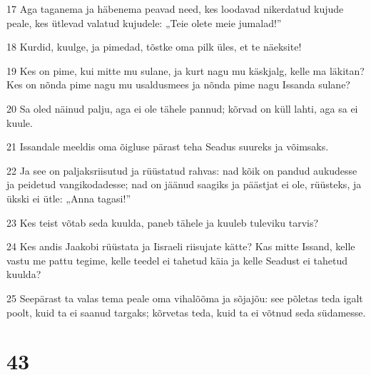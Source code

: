 \par 17 Aga taganema ja häbenema peavad need, kes loodavad nikerdatud kujude peale, kes ütlevad valatud kujudele: „Teie olete meie jumalad!”
\par 18 Kurdid, kuulge, ja pimedad, tõstke oma pilk üles, et te näeksite!
\par 19 Kes on pime, kui mitte mu sulane, ja kurt nagu mu käskjalg, kelle ma läkitan? Kes on nõnda pime nagu mu usaldusmees ja nõnda pime nagu Issanda sulane?
\par 20 Sa oled näinud palju, aga ei ole tähele pannud; kõrvad on küll lahti, aga sa ei kuule.
\par 21 Issandale meeldis oma õigluse pärast teha Seadus suureks ja võimsaks.
\par 22 Ja see on paljaksriisutud ja rüüstatud rahvas: nad kõik on pandud aukudesse ja peidetud vangikodadesse; nad on jäänud saagiks ja päästjat ei ole, rüüsteks, ja ükski ei ütle: „Anna tagasi!”
\par 23 Kes teist võtab seda kuulda, paneb tähele ja kuuleb tuleviku tarvis?
\par 24 Kes andis Jaakobi rüüstata ja Iisraeli riisujate kätte? Kas mitte Issand, kelle vastu me pattu tegime, kelle teedel ei tahetud käia ja kelle Seadust ei tahetud kuulda?
\par 25 Seepärast ta valas tema peale oma vihalõõma ja sõjajõu: see põletas teda igalt poolt, kuid ta ei saanud targaks; kõrvetas teda, kuid ta ei võtnud seda südamesse.

\chapter{43}

